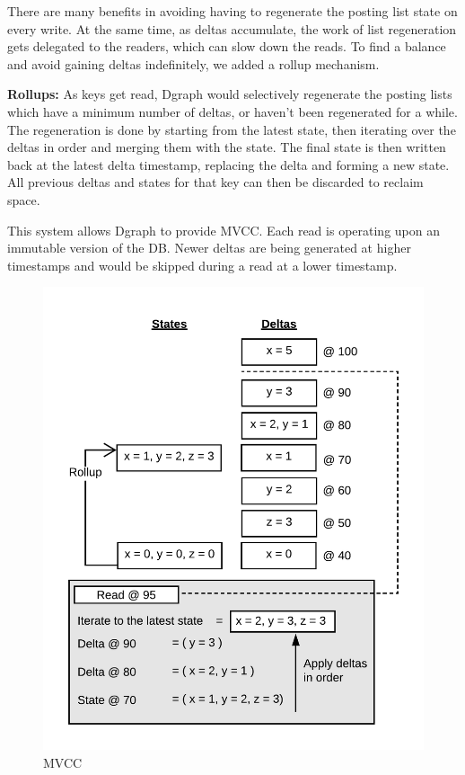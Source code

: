 \documentclass[letterpaper,twocolumn,10pt]{article}
\begin{document}
There are many benefits in avoiding having to regenerate the posting list state
on every write. At the same time, as deltas accumulate, the work of list
regeneration gets delegated to the readers, which can slow down the reads. To
find a balance and avoid gaining deltas indefinitely, we added a rollup mechanism.

\textbf{Rollups:} As keys get read, Dgraph would selectively regenerate the
posting lists which have a minimum number of deltas, or haven't been regenerated
for a while. The regeneration is done by starting from the latest state, then
iterating over the deltas in order and merging them with the state. The final
state is then written back at the latest delta timestamp, replacing the delta
and forming a new state.  All previous deltas and states for that key can then
be discarded to reclaim space.

This system allows Dgraph to provide MVCC. Each read is operating upon an
immutable version of the DB. Newer deltas are being generated at higher
timestamps and would be skipped during a read at a lower timestamp.

\begin{figure}[t]
\begin{center}
	\includegraphics[scale=0.8]{mvcc.png}
\end{center}
\caption{MVCC}
\label{fig:mvcc}
\end{figure}
\end{document}
